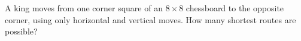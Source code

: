 A king moves from one corner square of an $8\times8$ chessboard to the opposite corner, using only horizontal and vertical moves. How many shortest routes are possible?
